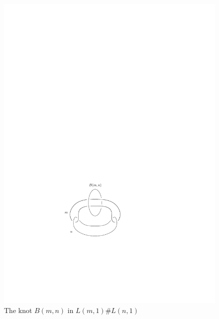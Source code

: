 \begin{example}
\begin{figure}[tb]
\centering
\includegraphics[scale=1]{graphics/knot-B(m,n)}
\caption{The knot $B(m,n)$ in $L(m,1) \# L(n,1)$}
\label{Borromean knot}
\end{figure}


\end{example}
